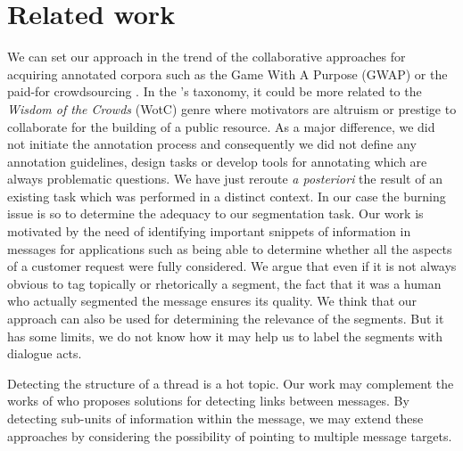 \section{Related work}
\label{sec:relatedWork}

We can set our approach in the trend of the collaborative approaches for acquiring
annotated corpora such as the Game With A Purpose (GWAP) \cite{ahn:2006:computer} or the paid-for crowdsourcing \cite{fort:2011:cl}.
In the \cite{wang:2013:lre}'s taxonomy, it could be more related to the \textit{Wisdom of the Crowds} (WotC) genre where motivators are altruism or prestige to collaborate for the building of a public resource.
As a major difference, we did not initiate the annotation process and consequently we did not define any annotation guidelines, design tasks or develop tools for annotating which are always problematic questions.
We have just reroute \textit{a posteriori} the result of an existing task which was performed in a distinct context.
In our case the burning issue is so to determine the adequacy to our segmentation task.
Our work is motivated by the need of identifying important snippets of information in messages for applications such as being able to determine whether all the aspects of a customer request were fully considered.
We argue that even if it is not always obvious to tag topically or rhetorically a segment, the fact that it was a human who actually segmented the message ensures its quality.
%
%
We think that our approach can also be used for determining the relevance of the segments. But it has some limits, we do not know how it may help us to label the segments with dialogue acts.

Detecting the structure of a thread is a hot topic. Our work may complement the works of \cite{li:2011:threadlinking;kim:2010:taggingandlinking} who proposes solutions for detecting links between messages. 
By detecting sub-units of information within the message, we may extend these approaches by considering the possibility of pointing to multiple message targets.

